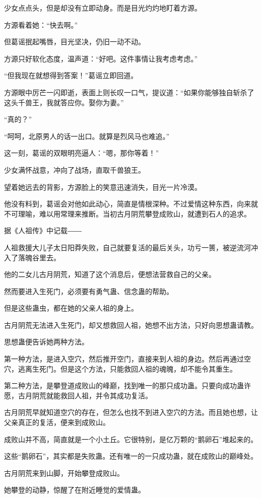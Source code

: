 \begin{this_body}
少女点点头，但是却没有立即动身。而是目光灼灼地盯着方源。

方源看着她：“快去啊。”

但葛谣抿起嘴唇，目光坚决，仍旧一动不动。

方源只好软化态度，温声道：“好吧。这件事情让我考虑考虑。”

“但我现在就想得到答案！”葛谣立即回道。

方源眼中厉芒一闪即逝，表面上则长叹一口气，提议道：“如果你能够独自斩杀了这头千兽王，我就答应你。娶你为妻。”

“真的？”

“呵呵，北原男人的话一出口。就算是烈风马也难追。”

这一刻，葛谣的双眼明亮逼人：“嗯，那你等着！”

少女满怀战意，冲向了战场，直取千兽狼王。

望着她远去的背影，方源脸上的笑意迅速消失，目光一片冷漠。

他没有料到，葛谣会对他如此动心，简直是情根深种。不过爱情这种东西，向来就不可理喻，难以用常理来推断。当初古月阴荒攀登成败山，就遭到石人的追求。

据《人祖传》中记载――

人祖救援大儿子太日阳莽失败，自己就要复活的最后关头，功亏一篑，被逆流河冲入了落魄谷里去。

他的二女儿古月阴荒，知道了这个消息后，便想法营救自己的父亲。

然而要进入生死门，必须要有勇气蛊、信念蛊的帮助。

但是这些蛊虫，都在她的父亲人祖的身上。

古月阴荒无法进入生死门，却又想救回人祖，她想不出方法，只好向思想蛊请教。

思想蛊便告诉她两种方法。

第一种方法，是进入空穴，然后推开空门，直接来到人祖的身边。然后再通过空穴，逃离生死门。但是这个方法，只能救回人祖的魂魄，却不能令其重生。

第二种方法，是攀登道成败山的峰巅，找到唯一的那只成功蛊。只要向成功蛊许愿，古月阴荒就能救回人祖，并令其成功复活。

古月阴荒早就知道空穴的存在，但怎么也找不到进入空穴的方法。而且她也想，让父亲真正的复活，便来到成败山。

成败山并不高，简直就是一个小土丘。它很特别，是亿万颗的“鹅卵石”堆起来的。

这些“鹅卵石”，其实都是失败蛊。还有唯一的一只成功蛊，就在成败山的巅峰处。

古月阴荒来到山脚，开始攀登成败山。

她攀登的动静，惊醒了在附近睡觉的爱情蛊。


\end{this_body}
